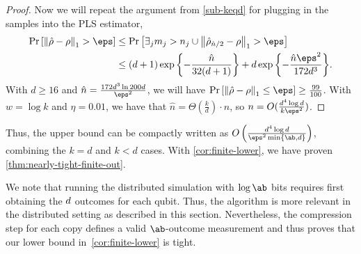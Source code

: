 \begin{proof}
   Now we will repeat the argument from \cref{sub-keqd} for plugging in the samples into the PLS estimator,
   \begin{align*}
       \Pr\left[\tracenorm{\hat{\rho} - \rho} > \eps \right] &\leq \Pr\left[\exists_j m_j > n_j \cup \tracenorm{\hat{\rho}_{\hat{n}/2} - \rho} > \eps\right] \\
       &\leq (d+1) \exp{\left\{-\frac{\hat{n}}{32(d+1)}\right\}} + d \exp{\left\{-\frac{\hat{n} \eps^2}{172 d^3}\right\}}.
   \end{align*}
With $d \geq 16$ and $\hat{n} = \frac{172d^3 \ln{200d}}{\eps^2}$, we will have $\Pr\left[\tracenorm{\hat{\rho} - \rho} \le \eps \right] \geq \frac{99}{100}$. With $w = \log k$ and $\eta = 0.01$, we have that $\hat{n} = \Theta(\frac{k}{d}) \cdot n$, so $n = O(\frac{d^4 \log{d}}{k \eps^2} )$.
\end{proof}
Thus, the upper bound can be compactly written as $O\left(\frac{\dims^4 \log{d}}{\eps^2\min\{\ab, \dims\}}\right)$, combining the $k=d$ and $k < d$ cases. With \cref{cor:finite-lower}, we have proven \cref{thm:nearly-tight-finite-out}.

\begin{remark}
    We note that running the distributed simulation with $\log\ab$ bits requires first obtaining the $d$ outcomes for each qubit. Thus, the algorithm is more relevant in the distributed setting as described in this section. Nevertheless, the compression step for each copy defines a valid $\ab$-outcome measurement and thus proves that our lower bound in~\cref{cor:finite-lower} is tight.
\end{remark}

